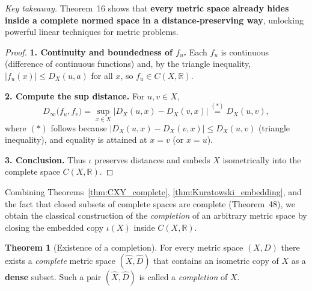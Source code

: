 \documentclass[12pt]{article}
\theoremstyle{definition} %
\newtheorem{theorem}{Theorem}
\theoremstyle{plain} %
\begin{document}
  \medskip
  \noindent
  \emph{Key takeaway.}
  Theorem~16 shows that \textbf{every metric space already hides inside a
  complete normed space in a distance‐preserving way}, unlocking powerful
  linear techniques for metric problems.
\begin{proof}
  \textbf{1.  Continuity and boundedness of $f_u$.}  
  Each $f_u$ is continuous (difference of continuous functions) and,
  by the triangle inequality,
  \(
      |f_u(x)|\le D_X(u,a)
  \)
  for all $x$, so $f_u\in C(X,\mathbb R)$.

  \textbf{2.  Compute the sup distance.}  
  For $u,v\in X$,
  \[
      D_\infty\!\bigl(f_u,f_v\bigr)
      =\sup_{x\in X}\bigl|D_X(u,x)-D_X(v,x)\bigr|
      \overset{(\ast)}{=}D_X(u,v),
  \]
  where $(\ast)$ follows because  
  $\bigl|D_X(u,x)-D_X(v,x)\bigr|\le D_X(u,v)$ (triangle inequality),
  and equality is attained at $x=v$ (or $x=u$).

  \textbf{3.  Conclusion.}  
  Thus $\iota$ preserves distances and embeds $X$ isometrically into the
  complete space $C(X,\mathbb R)$.
\end{proof}

\medskip
Combining Theorems \ref{thm:CXY_complete},
\ref{thm:Kuratowski_embedding},
and the fact that closed subsets of complete spaces are complete
(Theorem 48), we obtain the classical construction of the
\emph{completion} of an arbitrary metric space by closing the embedded
copy $\iota(X)$ inside $C(X,\mathbb R)$.
\begin{theorem}[Existence of a completion]\label{thm:completion_exist}
  For every metric space $(X,D)$ there exists a \emph{complete}
  metric space $(\widehat{X},\widehat{D})$ that contains an
  isometric copy of $X$ as a \textbf{dense} subset.
  Such a pair $(\widehat{X},\widehat{D})$ is called a
  \emph{completion} of $X$.
\end{theorem}
\end{document}
